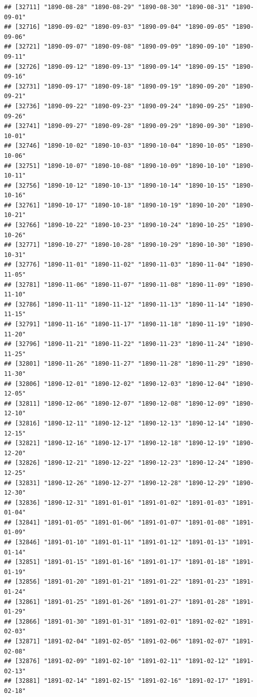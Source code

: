 \documentclass{article}\usepackage[]{graphicx}\usepackage[]{color}
\makeatletter
\newenvironment{kframe}{%
 \def\at@end@of@kframe{}%
 \ifinner\ifhmode%
  \def\at@end@of@kframe{\end{minipage}}%
  \begin{minipage}{\columnwidth}%
 \fi\fi%
 \def\FrameCommand##1{\hskip\@totalleftmargin \hskip-\fboxsep
 \colorbox{shadecolor}{##1}\hskip-\fboxsep
     \hskip-\linewidth \hskip-\@totalleftmargin \hskip\columnwidth}%
 \MakeFramed {\advance\hsize-\width
   \@totalleftmargin\z@ \linewidth\hsize
   \@setminipage}}%
 {\par\unskip\endMakeFramed%
 \at@end@of@kframe}
\newenvironment{knitrout}{}{} %
\makeatother
\begin{document}
\begin{description}
\begin{knitrout}
\begin{kframe}
\begin{verbatim}
## [32711] "1890-08-28" "1890-08-29" "1890-08-30" "1890-08-31" "1890-09-01"
## [32716] "1890-09-02" "1890-09-03" "1890-09-04" "1890-09-05" "1890-09-06"
## [32721] "1890-09-07" "1890-09-08" "1890-09-09" "1890-09-10" "1890-09-11"
## [32726] "1890-09-12" "1890-09-13" "1890-09-14" "1890-09-15" "1890-09-16"
## [32731] "1890-09-17" "1890-09-18" "1890-09-19" "1890-09-20" "1890-09-21"
## [32736] "1890-09-22" "1890-09-23" "1890-09-24" "1890-09-25" "1890-09-26"
## [32741] "1890-09-27" "1890-09-28" "1890-09-29" "1890-09-30" "1890-10-01"
## [32746] "1890-10-02" "1890-10-03" "1890-10-04" "1890-10-05" "1890-10-06"
## [32751] "1890-10-07" "1890-10-08" "1890-10-09" "1890-10-10" "1890-10-11"
## [32756] "1890-10-12" "1890-10-13" "1890-10-14" "1890-10-15" "1890-10-16"
## [32761] "1890-10-17" "1890-10-18" "1890-10-19" "1890-10-20" "1890-10-21"
## [32766] "1890-10-22" "1890-10-23" "1890-10-24" "1890-10-25" "1890-10-26"
## [32771] "1890-10-27" "1890-10-28" "1890-10-29" "1890-10-30" "1890-10-31"
## [32776] "1890-11-01" "1890-11-02" "1890-11-03" "1890-11-04" "1890-11-05"
## [32781] "1890-11-06" "1890-11-07" "1890-11-08" "1890-11-09" "1890-11-10"
## [32786] "1890-11-11" "1890-11-12" "1890-11-13" "1890-11-14" "1890-11-15"
## [32791] "1890-11-16" "1890-11-17" "1890-11-18" "1890-11-19" "1890-11-20"
## [32796] "1890-11-21" "1890-11-22" "1890-11-23" "1890-11-24" "1890-11-25"
## [32801] "1890-11-26" "1890-11-27" "1890-11-28" "1890-11-29" "1890-11-30"
## [32806] "1890-12-01" "1890-12-02" "1890-12-03" "1890-12-04" "1890-12-05"
## [32811] "1890-12-06" "1890-12-07" "1890-12-08" "1890-12-09" "1890-12-10"
## [32816] "1890-12-11" "1890-12-12" "1890-12-13" "1890-12-14" "1890-12-15"
## [32821] "1890-12-16" "1890-12-17" "1890-12-18" "1890-12-19" "1890-12-20"
## [32826] "1890-12-21" "1890-12-22" "1890-12-23" "1890-12-24" "1890-12-25"
## [32831] "1890-12-26" "1890-12-27" "1890-12-28" "1890-12-29" "1890-12-30"
## [32836] "1890-12-31" "1891-01-01" "1891-01-02" "1891-01-03" "1891-01-04"
## [32841] "1891-01-05" "1891-01-06" "1891-01-07" "1891-01-08" "1891-01-09"
## [32846] "1891-01-10" "1891-01-11" "1891-01-12" "1891-01-13" "1891-01-14"
## [32851] "1891-01-15" "1891-01-16" "1891-01-17" "1891-01-18" "1891-01-19"
## [32856] "1891-01-20" "1891-01-21" "1891-01-22" "1891-01-23" "1891-01-24"
## [32861] "1891-01-25" "1891-01-26" "1891-01-27" "1891-01-28" "1891-01-29"
## [32866] "1891-01-30" "1891-01-31" "1891-02-01" "1891-02-02" "1891-02-03"
## [32871] "1891-02-04" "1891-02-05" "1891-02-06" "1891-02-07" "1891-02-08"
## [32876] "1891-02-09" "1891-02-10" "1891-02-11" "1891-02-12" "1891-02-13"
## [32881] "1891-02-14" "1891-02-15" "1891-02-16" "1891-02-17" "1891-02-18"

\end{verbatim}
\end{kframe}
\end{knitrout}
\end{description}
\end{document}

